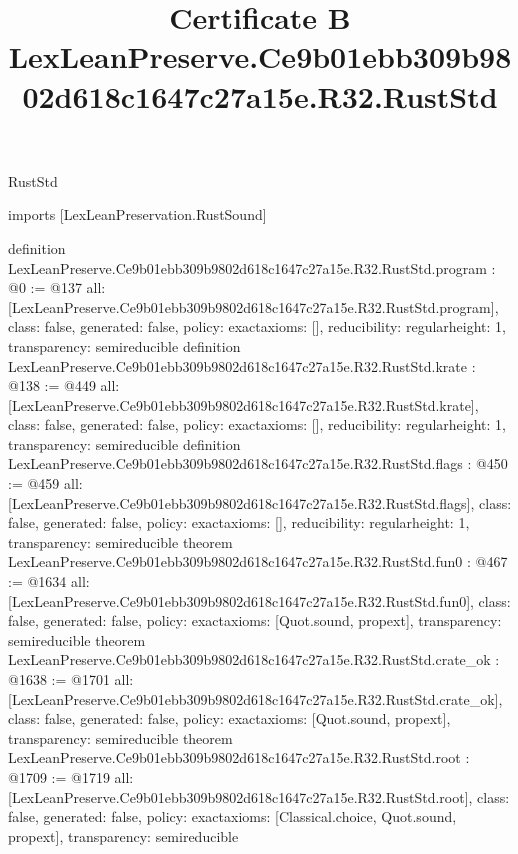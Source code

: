 \begin{lexlean}{RustStd}
\title{Certificate B LexLeanPreserve.Ce9b01ebb309b9802d618c1647c27a15e.R32.RustStd}
\begin{coremodule}
imports [LexLeanPreservation.RustSound]

definition LexLeanPreserve.Ce9b01ebb309b9802d618c1647c27a15e.R32.RustStd.program : @0 := @137 {
  all: [LexLeanPreserve.Ce9b01ebb309b9802d618c1647c27a15e.R32.RustStd.program],
  class: false,
  generated: false,
  policy: exact{axioms: []},
  reducibility: regular{height: 1},
  transparency: semireducible
}
definition LexLeanPreserve.Ce9b01ebb309b9802d618c1647c27a15e.R32.RustStd.krate : @138 := @449 {
  all: [LexLeanPreserve.Ce9b01ebb309b9802d618c1647c27a15e.R32.RustStd.krate],
  class: false,
  generated: false,
  policy: exact{axioms: []},
  reducibility: regular{height: 1},
  transparency: semireducible
}
definition LexLeanPreserve.Ce9b01ebb309b9802d618c1647c27a15e.R32.RustStd.flags : @450 := @459 {
  all: [LexLeanPreserve.Ce9b01ebb309b9802d618c1647c27a15e.R32.RustStd.flags],
  class: false,
  generated: false,
  policy: exact{axioms: []},
  reducibility: regular{height: 1},
  transparency: semireducible
}
theorem LexLeanPreserve.Ce9b01ebb309b9802d618c1647c27a15e.R32.RustStd.fun0 : @467 := @1634 {
  all: [LexLeanPreserve.Ce9b01ebb309b9802d618c1647c27a15e.R32.RustStd.fun0],
  class: false,
  generated: false,
  policy: exact{axioms: [Quot.sound, propext]},
  transparency: semireducible
}
theorem LexLeanPreserve.Ce9b01ebb309b9802d618c1647c27a15e.R32.RustStd.crate_ok : @1638 := @1701 {
  all: [LexLeanPreserve.Ce9b01ebb309b9802d618c1647c27a15e.R32.RustStd.crate_ok],
  class: false,
  generated: false,
  policy: exact{axioms: [Quot.sound, propext]},
  transparency: semireducible
}
theorem LexLeanPreserve.Ce9b01ebb309b9802d618c1647c27a15e.R32.RustStd.root : @1709 := @1719 {
  all: [LexLeanPreserve.Ce9b01ebb309b9802d618c1647c27a15e.R32.RustStd.root],
  class: false,
  generated: false,
  policy: exact{axioms: [Classical.choice, Quot.sound, propext]},
  transparency: semireducible
}


\end{coremodule}
\end{lexlean}
